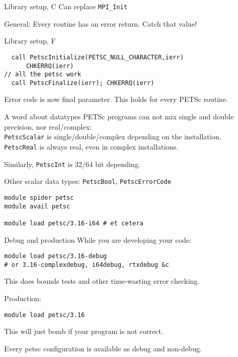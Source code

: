 \lstset{language=C}

\begin{numberedframe}{Library setup, C}
Can replace \lstinline{MPI_Init}

General: Every routine has an error return. Catch that value!
\end{numberedframe}

\lstset{language=Fortran}
\begin{fortran}
\begin{numberedframe}{Library setup, F}
\begin{lstlisting}
  call PetscInitialize(PETSC_NULL_CHARACTER,ierr)
      CHKERRQ(ierr)
// all the petsc work
  call PetscFinalize(ierr); CHKERRQ(ierr)
\end{lstlisting}
Error code is now final parameter. This holds for every PETSc routine.
\end{numberedframe}
\end{fortran}

\lstset{language=C}

\begin{numberedframe}{A word about datatypes}
PETSc programs can not mix single and double precision, nor real/complex:\\
\lstinline{PetscScalar} is single/double/complex depending on the installation.\\
\lstinline{PetscReal} is always real, even in complex installations.

Similarly, \lstinline{PetscInt} is 32/64 bit depending.

Other scalar data types: \lstinline{PetscBool}, \lstinline{PetscErrorCode}

\begin{taccnote}
\begin{verbatim}
module spider petsc
module avail petsc

module load petsc/3.16-i64 # et cetera
\end{verbatim}
\end{taccnote}

\end{numberedframe}

\begin{numberedframe}{Debug and production}
While you are developing your code:
\begin{verbatim}
module load petsc/3.16-debug
# or 3.16-complexdebug, i64debug, rtxdebug &c
\end{verbatim}
This does bounds tests and other time-wasting error checking.

Production:
\begin{verbatim}
module load petsc/3.16
\end{verbatim}
This will just bomb if your program is not correct.

Every petsc configuration is available as debug and non-debug.
\end{numberedframe}

